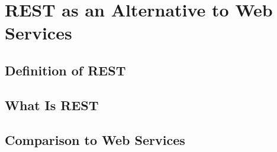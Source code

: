 \chapter{REST as an Alternative to Web Services}

\section{Definition of REST}
\section{What Is REST}
\section{Comparison to Web Services}
